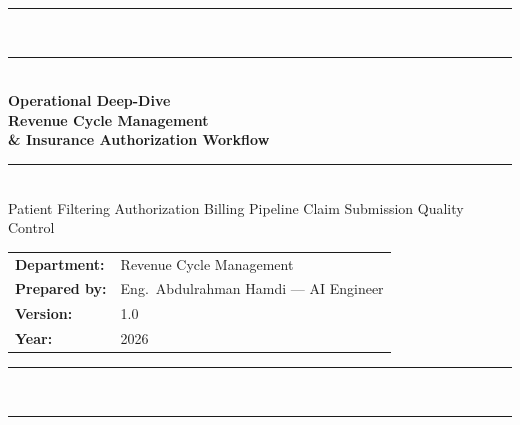 \documentclass[11pt,a4paper]{article}
\begin{document}

\begin{titlepage}
\pagecolor{PrimaryBlue}\color{white}
\vspace*{0.8cm}
\begin{center}
  \textcolor{AccentGold}{\rule{0.88\linewidth}{2pt}}\\[0.3em]
  \textcolor{AccentGold}{\rule{0.88\linewidth}{0.5pt}}\\[1.6cm]

  {\fontsize{32}{40}\selectfont\bfseries Operational Deep-Dive}\\[0.3em]
  {\fontsize{22}{30}\selectfont\bfseries Revenue Cycle Management}\\[0.2em]
  {\fontsize{20}{28}\selectfont\bfseries \& Insurance Authorization Workflow}\\[1.0em]

  \textcolor{AccentGold}{\rule{0.5\linewidth}{0.8pt}}\\[0.8em]
  {\color{SoftBlue}\small
    Patient Filtering \textbullet{} Authorization \textbullet{}
    Billing Pipeline \textbullet{} Claim Submission \textbullet{} Quality Control}\\[2.4cm]

  \begin{tabular}{@{}ll@{}}
    \textcolor{AccentGold}{\bfseries Department:} & Revenue Cycle Management \\[0.3em]
    \textcolor{AccentGold}{\bfseries Prepared by:} & Eng.\ Abdulrahman Hamdi --- AI Engineer \\[0.3em]
    \textcolor{AccentGold}{\bfseries Version:} & 1.0 \\[0.3em]
    \textcolor{AccentGold}{\bfseries Year:} & 2026 \\
  \end{tabular}

  \vfill
  \textcolor{AccentGold}{\rule{0.88\linewidth}{0.5pt}}\\[0.3em]
  \textcolor{AccentGold}{\rule{0.88\linewidth}{2pt}}
\end{center}
\end{titlepage}
\nopagecolor\color{black}

\newpage
\tableofcontents
\newpage
\end{document}
